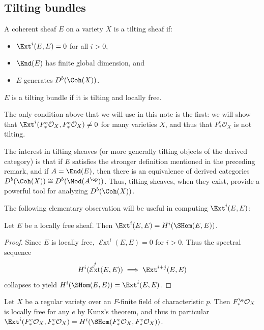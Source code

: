 \documentclass{article}
\def\O{\mathcal O}
\numberwithin{equation}{section}
\theoremstyle{theorem}
\numberwithin{thm}{section}
\theoremstyle{definition}
\DeclareMathOperator{\SExt}{\mathcal{E}xt}
\begin{document}
\subsection{Tilting bundles}


\begin{dfn}
A coherent sheaf $E$ on a variety $X$ is a tilting sheaf if:
\begin{itemize}
\item 
$\Ext^i(E,E)=0$ for all $i>0$,
\item
$\End(E)$ has finite global dimension, and
\item $E$ generates $D^b(\Coh(X))$.
\end{itemize}
$E$ is a tilting bundle if it is tilting and locally free.
\end{dfn}

\begin{rem}
The only condition above that we will use in this note is the first: we will show that $\Ext^i(F_*^e\O_X,F_*^e\O_X)\neq 0$ for many varieties $X$, and thus that $F_*^e\O_X$ is not tilting.
\end{rem}

\begin{rem}
The interest in tilting sheaves (or more generally tilting objects of the derived category) is that if $E$ satisfies the stronger definition mentioned in the preceding remark, and if $A=\End(E)$, then there is an equivalence of derived categories $D^b(\Coh (X))\cong D^b(\Mod (A^\op))$. Thus, tilting sheaves, when they exist, provide a powerful tool for analyzing $D^b(\Coh(X))$.
\end{rem}

The following elementary observation will be useful in computing $\Ext^i(E,E)$:

\begin{lem}
Let $E$ be a locally free sheaf. Then $\Ext^i(E,E)=H^i(\SHom(E,E))$.
\end{lem}

\begin{proof}
Since $E$ is locally free, $\SExt^i(E,E)=0$ for $i>0$. Thus the spectral sequence
$$
H^i(\SExt^j(E,E))\implies \Ext^{i+j}(E,E)
$$
collapses to yield $H^i(\SHom(E,E))=\Ext^i(E,E)$.
\end{proof}

\begin{rem}
Let $X$ be a regular variety over an $F$-finite field of characteristic $p$. Then $F_*^\e\O_X$ is locally free for any $e$ by Kunz's theorem, and thus in particular
$\Ext^i(F_*^e\O_X,F_*^e\O_X)=H^i(\SHom(F_*^e\O_X,F_*^e\O_X))$.
\end{rem}
\end{document}
